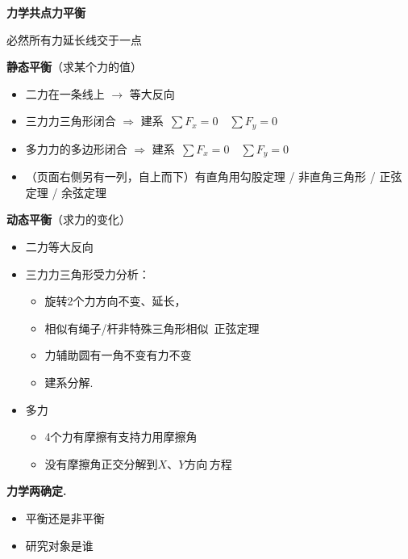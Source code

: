 \textbf{力学\quad 共点力平衡}

必然\quad 所有力延长线交于一点

\medskip
\textbf{静态平衡}\quad （求某个力的值）
\begin{itemize}
\item 二力\quad 在一条线上 $\to$ 等大反向
\item 三力\quad 力三角形闭合 $\Rightarrow$ 建系\ $\sum F_x=0$\ \ $\sum F_y=0$
\item 多力\quad 力的多边形闭合 $\Rightarrow$ 建系\ $\sum F_x=0$\ \ $\sum F_y=0$
\item （页面右侧另有一列，自上而下）有直角用勾股定理 / 非直角三角形 / 正弦定理 / 余弦定理
\end{itemize}

\medskip
\textbf{动态平衡}\quad （求力的变化）
\begin{itemize}
\item 二力\quad 等大反向
\item 三力\quad 力三角形\quad 受力分析：
  \begin{itemize}
  \item 旋转\quad 2个力方向不变\quad 、延长，
  \item 相似\quad 有绳子/杆\quad 非特殊三角形\quad 相似\ 正弦定理
  \item 力辅助圆\quad 有一角不变\quad 有力不变
  \item 建系分解.
  \end{itemize}
\item 多力 %
  \begin{itemize}
  \item 4个力\quad 有摩擦\quad 有支持力\quad 用摩擦角
  \item 没有摩擦角\quad 正交分解到$X$、$Y$方向\,方程
  \end{itemize}
\end{itemize}
\textbf{力学两确定.}
\begin{itemize}
\item 平衡还是非平衡
\item 研究对象是谁
\end{itemize}
